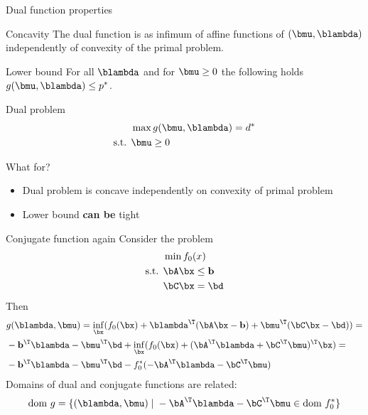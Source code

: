 \documentclass[12pt]{beamer}
\begin{document}
\begin{frame}{Dual function properties}
\small
\begin{block}{Concavity}
The dual function is {\color{red}{concave}} as infimum of affine functions of $(\bmu, \blambda)$ independently of convexity of the primal problem.
\end{block}

\begin{block}{Lower bound}
For all $\blambda$ and for $\bmu \geq 0$ the following holds $g(\bmu, \blambda) \leq p^*$.
\end{block}

\begin{block}{Dual problem}
\vspace{-5mm}
\begin{equation*}
\begin{split}
& \max g(\bmu, \blambda) = d^*\\
\text{s.t. } & \bmu \geq 0
\end{split}
\end{equation*}
\end{block}

\begin{block}{What for?}
\begin{itemize}
\vspace{-2mm}
\item Dual problem is concave independently on convexity of primal problem
\vspace{-3mm}
\item Lower bound \textbf{can be} tight
\end{itemize}
\end{block}
\end{frame}

\begin{frame}{Conjugate function again}
Consider the problem
\begin{equation*}
\begin{split}
&\min f_0(x) \\
\text{s.t. } & \bA\bx \leq \mathbf{b}\\
& \bC\bx = \bd
\end{split}
\end{equation*}
Then
\begin{equation*}
\begin{split}
& g(\blambda, \bmu) = \inf_{\bx} (f_0(\bx) + \blambda^{\T}(\bA\bx - \mathbf{b}) + \bmu^{\T}(\bC\bx - \bd)) = \\
& - \mathbf{b}^{\T}\blambda - \bmu^{\T}\bd + \inf_{\bx}(f_0(\bx) + (\bA^{\T}\blambda + \bC^{\T}\bmu)^{\T}\bx) = \\
& - \mathbf{b}^{\T}\blambda - \bmu^{\T}\bd - f_0^*(-\bA^{\T}\blambda - \bC^{\T}\bmu)
\end{split}
\end{equation*}
Domains of dual and conjugate functions are related:
\[
\text{dom } g = \{ (\blambda, \bmu) \; | \; -\bA^{\T}\blambda - \bC^{\T}\bmu \in \text{dom } f^*_0 \}
\] 
\end{frame}
\end{document}
